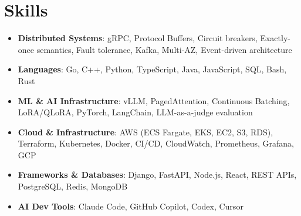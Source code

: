 \documentclass[letterpaper,11pt]{article}
\newcommand{\resumeSubHeadingListStart}{\begin{itemize}[leftmargin=0.15in, label={}]}
\newcommand{\resumeSubHeadingListEnd}{\end{itemize}}
\newcommand{\resumeSkillHeading}[2]{%
  \item\small{\textbf{#1}: #2 \vspace{-9pt}}%
}
\begin{document}
\section{Skills}
  \resumeSubHeadingListStart
    \resumeSkillHeading{Distributed Systems}{gRPC, Protocol Buffers, Circuit breakers, Exactly-once semantics, Fault tolerance, Kafka, Multi-AZ, Event-driven architecture}
    \resumeSkillHeading{Languages}{Go, C++, Python, TypeScript, Java, JavaScript, SQL, Bash, Rust}
    \resumeSkillHeading{ML \& AI Infrastructure}{vLLM, PagedAttention, Continuous Batching, LoRA/QLoRA, PyTorch, LangChain, LLM-as-a-judge evaluation}
    \resumeSkillHeading{Cloud \& Infrastructure}{AWS (ECS Fargate, EKS, EC2, S3, RDS), Terraform, Kubernetes, Docker, CI/CD, CloudWatch, Prometheus, Grafana, GCP}
    \resumeSkillHeading{Frameworks \& Databases}{Django, FastAPI, Node.js, React, REST APIs, PostgreSQL, Redis, MongoDB}
    \resumeSkillHeading{AI Dev Tools}{Claude Code, GitHub Copilot, Codex, Cursor}
  \resumeSubHeadingListEnd
\end{document}
